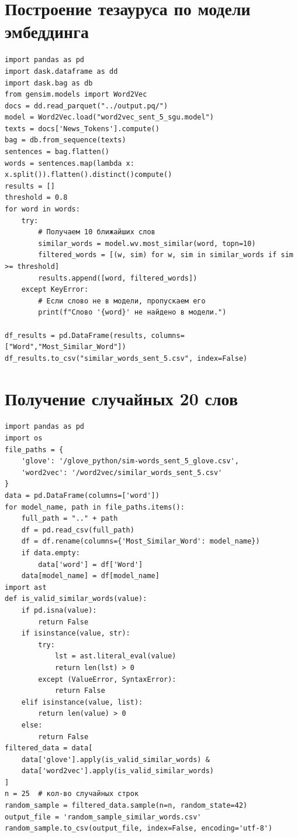 \documentclass[coursework]{SCWorks}
\begin{document}
\section{Построение тезауруса по модели эмбеддинга}
\label{apx:thesaurus}
\begin{verbatim}
import pandas as pd
import dask.dataframe as dd
import dask.bag as db
from gensim.models import Word2Vec
docs = dd.read_parquet("../output.pq/")
model = Word2Vec.load("word2vec_sent_5_sgu.model")
texts = docs['News_Tokens'].compute()
bag = db.from_sequence(texts)
sentences = bag.flatten()
words = sentences.map(lambda x: x.split()).flatten().distinct()compute()
results = []
threshold = 0.8
for word in words:
    try:
        # Получаем 10 ближайших слов
        similar_words = model.wv.most_similar(word, topn=10)
        filtered_words = [(w, sim) for w, sim in similar_words if sim >= threshold]
        results.append([word, filtered_words])
    except KeyError:
        # Если слово не в модели, пропускаем его
        print(f"Слово '{word}' не найдено в модели.")

df_results = pd.DataFrame(results, columns=["Word","Most_Similar_Word"])
df_results.to_csv("similar_words_sent_5.csv", index=False)
\end{verbatim}
\section{Получение случайных 20 слов}
\label{apx:cherrypick}
\begin{verbatim}
import pandas as pd
import os
file_paths = {
    'glove': '/glove_python/sim-words_sent_5_glove.csv',
    'word2vec': '/word2vec/similar_words_sent_5.csv'
}
data = pd.DataFrame(columns=['word'])
for model_name, path in file_paths.items():
    full_path = ".." + path
    df = pd.read_csv(full_path)
    df = df.rename(columns={'Most_Similar_Word': model_name})
    if data.empty:
        data['word'] = df['Word']
    data[model_name] = df[model_name]
import ast
def is_valid_similar_words(value):
    if pd.isna(value):
        return False
    if isinstance(value, str):
        try:
            lst = ast.literal_eval(value)
            return len(lst) > 0
        except (ValueError, SyntaxError):
            return False
    elif isinstance(value, list):
        return len(value) > 0
    else:
        return False
filtered_data = data[
    data['glove'].apply(is_valid_similar_words) &
    data['word2vec'].apply(is_valid_similar_words)
]
n = 25  # кол-во случайных строк
random_sample = filtered_data.sample(n=n, random_state=42)
output_file = 'random_sample_similar_words.csv'
random_sample.to_csv(output_file, index=False, encoding='utf-8')
\end{verbatim}
\end{document}
